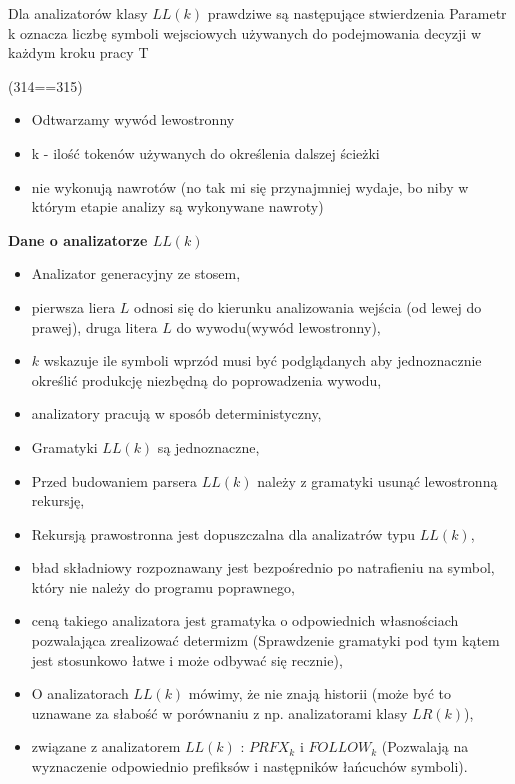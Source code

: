 \answer
{Dla analizatorów klasy $LL(k)$ prawdziwe są następujące stwierdzenia}
{Parametr k oznacza liczbę symboli wejsciowych używanych do podejmowania decyzji w każdym kroku pracy}
{T}
{(314==315)\\
\begin{itemize}
\item Odtwarzamy wywód lewostronny
\item k - ilość tokenów używanych do określenia dalszej ścieżki
\item nie wykonują nawrotów (no tak mi się przynajmniej wydaje, bo niby w którym etapie analizy są wykonywane nawroty)
\end{itemize}

\textbf{Dane o analizatorze $LL(k)$}
\begin{itemize}
\item Analizator generacyjny ze stosem,
\item pierwsza liera $L$ odnosi się do kierunku analizowania wejścia (od lewej do prawej),
druga litera $L$ do wywodu(wywód lewostronny),
\item $k$ wskazuje ile symboli wprzód musi być podglądanych aby jednoznacznie określić produkcję niezbędną do poprowadzenia wywodu,
\item analizatory pracują w sposób deterministyczny,
\item Gramatyki $LL(k)$ są jednoznaczne,
\item Przed budowaniem parsera $LL(k)$ należy z gramatyki usunąć lewostronną rekursję,
\item Rekursją prawostronna jest dopuszczalna dla analizatrów typu $LL(k)$,
\item bład składniowy rozpoznawany jest bezpośrednio po natrafieniu na symbol, który nie należy do programu poprawnego,
\item ceną takiego analizatora jest gramatyka o odpowiednich własnościach pozwalająca zrealizować determizm (Sprawdzenie gramatyki pod tym kątem jest stosunkowo łatwe i może odbywać się recznie),
\item O analizatorach $LL(k)$ mówimy, że nie znają historii (może być to uznawane za słabość w porównaniu z np. analizatorami klasy $LR(k)$),
\item związane z analizatorem $LL(k)$ : $PRFX_{k}$ i $FOLLOW_{k}$ (Pozwalają na wyznaczenie odpowiednio prefiksów i następników łańcuchów symboli).
\end{itemize}
}
{}

